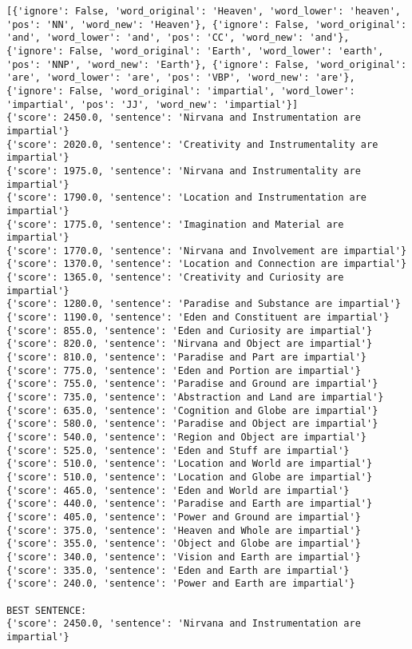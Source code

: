 \documentclass[12pt,a4paper,oneside]{book}
\begin{document}
\begin{verbatim}
[{'ignore': False, 'word_original': 'Heaven', 'word_lower': 'heaven', 'pos': 'NN', 'word_new': 'Heaven'}, {'ignore': False, 'word_original': 'and', 'word_lower': 'and', 'pos': 'CC', 'word_new': 'and'}, {'ignore': False, 'word_original': 'Earth', 'word_lower': 'earth', 'pos': 'NNP', 'word_new': 'Earth'}, {'ignore': False, 'word_original': 'are', 'word_lower': 'are', 'pos': 'VBP', 'word_new': 'are'}, {'ignore': False, 'word_original': 'impartial', 'word_lower': 'impartial', 'pos': 'JJ', 'word_new': 'impartial'}]
{'score': 2450.0, 'sentence': 'Nirvana and Instrumentation are impartial'}
{'score': 2020.0, 'sentence': 'Creativity and Instrumentality are impartial'}
{'score': 1975.0, 'sentence': 'Nirvana and Instrumentality are impartial'}
{'score': 1790.0, 'sentence': 'Location and Instrumentation are impartial'}
{'score': 1775.0, 'sentence': 'Imagination and Material are impartial'}
{'score': 1770.0, 'sentence': 'Nirvana and Involvement are impartial'}
{'score': 1370.0, 'sentence': 'Location and Connection are impartial'}
{'score': 1365.0, 'sentence': 'Creativity and Curiosity are impartial'}
{'score': 1280.0, 'sentence': 'Paradise and Substance are impartial'}
{'score': 1190.0, 'sentence': 'Eden and Constituent are impartial'}
{'score': 855.0, 'sentence': 'Eden and Curiosity are impartial'}
{'score': 820.0, 'sentence': 'Nirvana and Object are impartial'}
{'score': 810.0, 'sentence': 'Paradise and Part are impartial'}
{'score': 775.0, 'sentence': 'Eden and Portion are impartial'}
{'score': 755.0, 'sentence': 'Paradise and Ground are impartial'}
{'score': 735.0, 'sentence': 'Abstraction and Land are impartial'}
{'score': 635.0, 'sentence': 'Cognition and Globe are impartial'}
{'score': 580.0, 'sentence': 'Paradise and Object are impartial'}
{'score': 540.0, 'sentence': 'Region and Object are impartial'}
{'score': 525.0, 'sentence': 'Eden and Stuff are impartial'}
{'score': 510.0, 'sentence': 'Location and World are impartial'}
{'score': 510.0, 'sentence': 'Location and Globe are impartial'}
{'score': 465.0, 'sentence': 'Eden and World are impartial'}
{'score': 440.0, 'sentence': 'Paradise and Earth are impartial'}
{'score': 405.0, 'sentence': 'Power and Ground are impartial'}
{'score': 375.0, 'sentence': 'Heaven and Whole are impartial'}
{'score': 355.0, 'sentence': 'Object and Globe are impartial'}
{'score': 340.0, 'sentence': 'Vision and Earth are impartial'}
{'score': 335.0, 'sentence': 'Eden and Earth are impartial'}
{'score': 240.0, 'sentence': 'Power and Earth are impartial'}

BEST SENTENCE:
{'score': 2450.0, 'sentence': 'Nirvana and Instrumentation are impartial'}



\end{verbatim}
\end{document}
